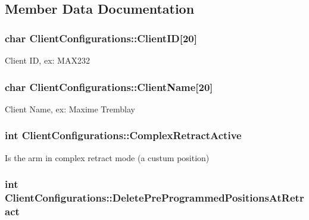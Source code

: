 \subsection{Member Data Documentation}
\hypertarget{struct_client_configurations_af6f24946f2f285f1075291b4bcca49d6}{
\subsubsection[{Client\-I\-D}]{\setlength{\rightskip}{0pt plus 5cm}char Client\-Configurations\-::\-Client\-I\-D\mbox{[}20\mbox{]}}}\label{struct_client_configurations_af6f24946f2f285f1075291b4bcca49d6}
Client I\-D, ex\-: M\-A\-X232 \hypertarget{struct_client_configurations_a5c4ef3ba3bcbd4f749fa3862a510e2fd}{
\subsubsection[{Client\-Name}]{\setlength{\rightskip}{0pt plus 5cm}char Client\-Configurations\-::\-Client\-Name\mbox{[}20\mbox{]}}}\label{struct_client_configurations_a5c4ef3ba3bcbd4f749fa3862a510e2fd}
Client Name, ex\-: Maxime Tremblay \hypertarget{struct_client_configurations_aa41bf35ba1a1dd92f54a30814d42f795}{
\subsubsection[{Complex\-Retract\-Active}]{\setlength{\rightskip}{0pt plus 5cm}int Client\-Configurations\-::\-Complex\-Retract\-Active}}\label{struct_client_configurations_aa41bf35ba1a1dd92f54a30814d42f795}
Is the arm in complex retract mode (a custum position) \hypertarget{struct_client_configurations_ab0dca6d6259625fafd1c725533337460}{
\subsubsection[{Delete\-Pre\-Programmed\-Positions\-At\-Retract}]{\setlength{\rightskip}{0pt plus 5cm}int Client\-Configurations\-::\-Delete\-Pre\-Programmed\-Positions\-At\-Retract}}\label{struct_client_configurations_ab0dca6d6259625fafd1c725533337460}
